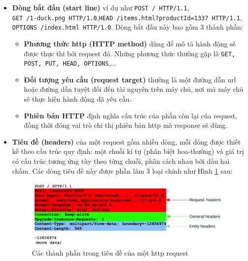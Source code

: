 \begin{itemize}
    \item \textbf{Dòng bắt đầu (start line)} ví dụ như \colorbox{gray!30}{\texttt{POST / HTTP/1.1}},\\\colorbox{gray!30}{\texttt{GET /1-duck.png HTTP/1.0}},\colorbox{gray!30}{\texttt{HEAD /items.html?productId=1337 HTTP/1.1}},\\\colorbox{gray!30}{\texttt{OPTIONS /index.html HTTP/1.0}}. Dòng bắt đầu này bao gồm 3 thành phần:
        \begin{itemize}
            \item \textbf{Phương thức \acrshort{http} (HTTP method)} dùng để mô tả hành động sẽ được thực thi bởi request đó. Những phương thức thường gặp là \texttt{GET, POST, PUT, HEAD, OPTIONS},...
            \item \textbf{Đối tượng yêu cầu (request target)} thường là một đường dẫn \acrshort{url} hoặc đường dẫn tuyệt đối đến tài nguyên trên máy chủ, nơi mà máy chủ sẽ thực hiện hành động đã yêu cầu.
            \item \textbf{Phiên bản HTTP} định nghĩa cấu trúc của phần còn lại của request, đồng thời đóng vai trò chỉ thị phiên bản \acrshort{http} mà response sẽ dùng.
        \end{itemize}
    \item \textbf{Tiêu đề (headers)} của một request gồm nhiều dòng, mỗi dòng được thiết kế theo cấu trúc quy định: một chuỗi kí tự (phân biệt hoa-thường) và giá trị có cấu trúc tương ứng tùy theo từng chuỗi, phân cách nhau bởi dấu hai chấm. Các dòng tiêu đề này được phần làm 3 loại chính như Hình \ref{fig:HTTP-request-headers} sau:
        \begin{figure}[H]
          \centering
            \includegraphics[width=\textwidth,keepaspectratio=true]{images/HTTP-request-headers.png}
          \caption[Các thành phần trong tiêu đề của một \acrshort{http} request]{Các thành phần trong tiêu đề của một \acrshort{http} request\protect\footnotemark}
          \label{fig:HTTP-request-headers}
        \end{figure}

\end{itemize}
